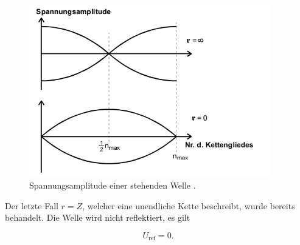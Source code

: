 \begin{figure}
  \centering
  \includegraphics[height = 7.5cm]{Reflexion.png}
  \caption{Spannungsamplitude einer stehenden Welle \cite{anleitung}.}
  \label{fig:BauchKnot}
\end{figure}

Der letzte Fall $r=Z$, welcher eine unendliche Kette beschreibt, wurde bereits
behandelt. Die Welle wird nicht reflektiert, es gilt

\begin{equation}
  U_\text{ref} = 0.
\end{equation}
